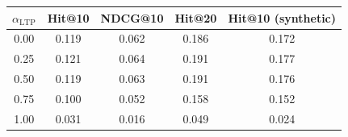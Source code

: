 \begin{tabular}{ccccc}
\toprule
$\alpha_{\text{LTP}}$ & Hit@10 & NDCG@10 & Hit@20 & Hit@10 (synthetic) \\
\midrule
0.00 & 0.119 & 0.062 & 0.186 & 0.172 \\
0.25 & 0.121 & 0.064 & 0.191 & 0.177 \\
0.50 & 0.119 & 0.063 & 0.191 & 0.176 \\
0.75 & 0.100 & 0.052 & 0.158 & 0.152 \\
1.00 & 0.031 & 0.016 & 0.049 & 0.024 \\
\bottomrule
\end{tabular}
